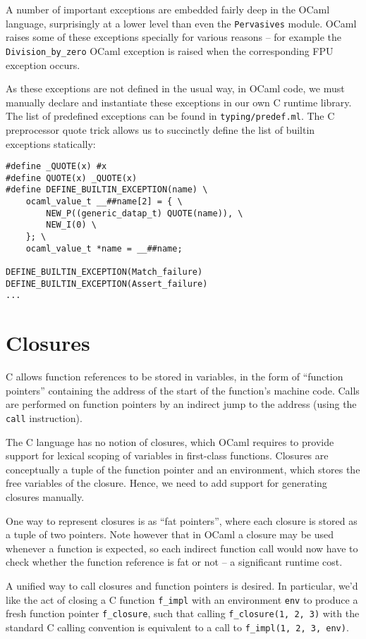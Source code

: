 \documentclass[12pt,a4paper,twoside,openright]{report}
\begin{document}
A number of important exceptions are embedded fairly deep in the OCaml
language, surprisingly at a lower level than even the \lstinline!Pervasives!
module. OCaml raises some of these exceptions specially for various reasons --
for example the \lstinline!Division_by_zero! OCaml exception is raised when the
corresponding FPU exception occurs.

As these exceptions are not defined in the usual way, in OCaml code, we must
manually declare and instantiate these exceptions in our own C runtime library.
The list of predefined exceptions can be found in \lstinline!typing/predef.ml!.
The C preprocessor quote trick allows us to succinctly define the list of
builtin exceptions statically:

\begin{lstlisting}
#define _QUOTE(x) #x
#define QUOTE(x) _QUOTE(x)
#define DEFINE_BUILTIN_EXCEPTION(name) \
    ocaml_value_t __##name[2] = { \
        NEW_P((generic_datap_t) QUOTE(name)), \
        NEW_I(0) \
    }; \
    ocaml_value_t *name = __##name;

DEFINE_BUILTIN_EXCEPTION(Match_failure)
DEFINE_BUILTIN_EXCEPTION(Assert_failure)
...
\end{lstlisting}

\section{Closures}\label{closures}

C allows function references to be stored in variables, in the form of
``function pointers'' containing the address of the start of the function's
machine code. Calls are performed on function pointers by an indirect jump to
the address (using the \lstinline!call! instruction).

The C language has no notion of closures, which OCaml requires to provide
support for lexical scoping of variables in first-class functions. Closures are
conceptually a tuple of the function pointer and an environment, which stores
the free variables of the closure. Hence, we need to add support for generating
closures manually.

One way to represent closures is as ``fat pointers'', where each closure is
stored as a tuple of two pointers. Note however that in OCaml a closure may be
used whenever a function is expected, so each indirect function call would now
have to check whether the function reference is fat or not -- a significant
runtime cost.

A unified way to call closures and function pointers is desired. In
particular, we'd like the act of closing a C function \lstinline!f_impl! with
an environment \lstinline!env! to produce a fresh function pointer
\lstinline!f_closure!, such that calling
\lstinline!f_closure(1, 2, 3)!
with the standard C calling convention is equivalent to a call to
\lstinline!f_impl(1, 2, 3, env)!.
\end{document}
